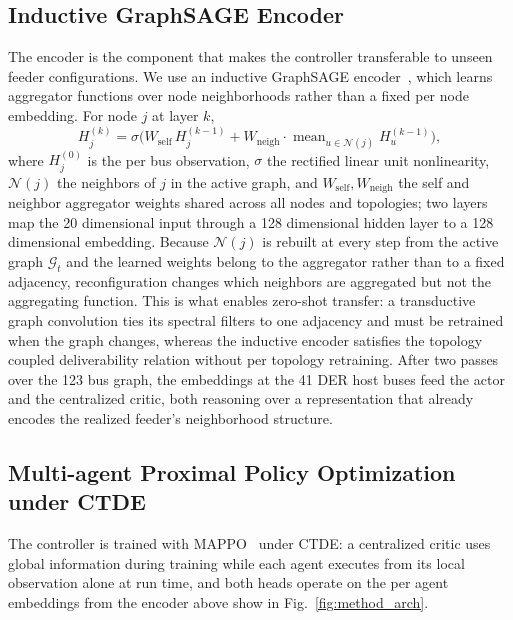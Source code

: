 \documentclass[lettersize,journal]{IEEEtran}
\begin{document}
	
	
	\subsection{Inductive GraphSAGE Encoder}
	\label{sec:method:graphsage}
	
	The encoder is the component that makes the controller transferable to unseen feeder configurations. We use an inductive GraphSAGE encoder~\cite{hamilton2017graphsage}, which learns aggregator functions over node neighborhoods rather than a fixed per node embedding. For node $j$ at layer $k$,
	\begin{equation}
		H_j^{(k)}
		= \sigma\!\Big(W_{\mathrm{self}}\,H_j^{(k-1)}
		+ W_{\mathrm{neigh}}\!\cdot\!
		\operatorname{mean}_{u\in\mathcal{N}(j)} H_u^{(k-1)}\Big),
		\label{eq:graphsage}
	\end{equation}
	where $H_j^{(0)}$ is the per bus observation, $\sigma$ the rectified linear unit nonlinearity, $\mathcal{N}(j)$ the neighbors of $j$ in the active graph, and $W_{\mathrm{self}},W_{\mathrm{neigh}}$ the self and neighbor aggregator weights shared across all nodes and topologies; two layers map the 20 dimensional input through a 128 dimensional hidden layer to a 128 dimensional embedding. Because $\mathcal{N}(j)$ is rebuilt at every step from the active graph $\mathcal{G}_t$ and the learned weights belong to the aggregator rather than to a fixed adjacency, reconfiguration changes which neighbors are aggregated but not the aggregating function. This is what enables zero-shot transfer: a transductive graph convolution ties its spectral filters to one adjacency and must be retrained when the graph changes, whereas the inductive encoder satisfies the topology coupled deliverability relation without per topology retraining. After two passes over the 123 bus graph, the embeddings at the 41 DER host buses feed the actor and the centralized critic, both reasoning over a representation that already encodes the realized feeder's neighborhood structure.
	
	\subsection{Multi-agent Proximal Policy Optimization under CTDE}
	\label{sec:method:mappo}
	
	The controller is trained with MAPPO~\cite{yu2022mappoeffective} under CTDE: a centralized critic uses global information during training while each agent executes from its local observation alone at run time, and both heads operate on the per agent embeddings from the encoder above show in Fig.~\ref{fig:method_arch}.
	
\end{document}
